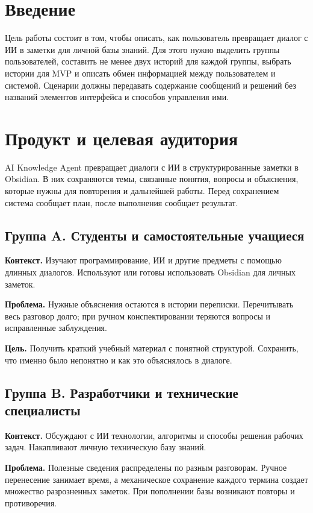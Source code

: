 


\section{Введение}

Цель работы состоит в том, чтобы описать, как пользователь превращает диалог с ИИ в заметки для личной базы знаний. Для этого нужно выделить группы пользователей, составить не менее двух историй для каждой группы, выбрать истории для MVP и описать обмен информацией между пользователем и системой. Сценарии должны передавать содержание сообщений и решений без названий элементов интерфейса и способов управления ими.


\section{Продукт и целевая аудитория}

AI Knowledge Agent превращает диалоги с ИИ в структурированные заметки в Obsidian. В них сохраняются темы, связанные понятия, вопросы и объяснения, которые нужны для повторения и дальнейшей работы. Перед сохранением система сообщает план, после выполнения сообщает результат.


\subsection{Группа A. Студенты и самостоятельные учащиеся}

\textbf{Контекст.} Изучают программирование, ИИ и другие предметы с помощью длинных диалогов. Используют или готовы использовать Obsidian для личных заметок.


\textbf{Проблема.} Нужные объяснения остаются в истории переписки. Перечитывать весь разговор долго; при ручном конспектировании теряются вопросы и исправленные заблуждения.


\textbf{Цель.} Получить краткий учебный материал с понятной структурой. Сохранить, что именно было непонятно и как это объяснялось в диалоге.


\subsection{Группа B. Разработчики и технические специалисты}

\textbf{Контекст.} Обсуждают с ИИ технологии, алгоритмы и способы решения рабочих задач. Накапливают личную техническую базу знаний.


\textbf{Проблема.} Полезные сведения распределены по разным разговорам. Ручное перенесение занимает время, а механическое сохранение каждого термина создает множество разрозненных заметок. При пополнении базы возникают повторы и противоречия.


